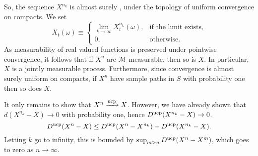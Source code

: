 \documentclass[12pt]{article}
\begin{document}
So, the sequence $X^{n_k}$ is almost surely , under the topology of uniform convergence on compacts. We set
\begin{equation*}
X_t(\omega)\equiv\left\{
\begin{array}{ll}
\lim_{k\rightarrow\infty}X^{n_k}_t(\omega),&\textrm{if the limit exists},\\
0,&\textrm{otherwise}.
\end{array}
\right.
\end{equation*}
As measurability of real valued functions is preserved under pointwise convergence, it follows that if $X^n$ are $\mathcal{M}$-measurable, then so is $X$. In particular, $X$ is a jointly measurable process.
Furthermore, since convergence is almost surely uniform on compacts, if $X^n$ have sample paths in $S$ with probability one then so does $X$.

It only remains to show that $X^n\xrightarrow{\rm ucp}X$. However, we have already shown that $d(X^{n_k}-X)\rightarrow 0$ with probability one, hence $D^{\rm ucp}(X^{n_k}-X)\rightarrow 0$.
\begin{equation*}
D^{\rm ucp}(X^n-X)\le D^{\rm ucp}(X^n-X^{n_{k}})+D^{\rm ucp}(X^{n_k}-X).
\end{equation*}
Letting $k$ go to infinity, this is bounded by $\sup_{m>n}D^{\rm ucp}(X^n-X^m)$, which goes to zero as $n\rightarrow\infty$.

\end{document}
